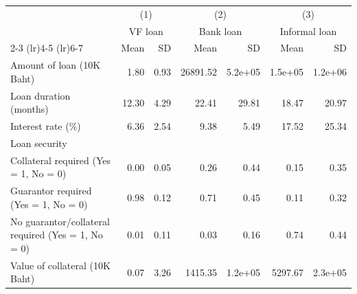 \begin{center} \begin{threeparttable} \begin{tabular}{l*{6}{r}} \hline \hline &\multicolumn{2}{c}{(1)}  &\multicolumn{2}{c}{(2)} &\multicolumn{2}{c}{(3)}\\  &\multicolumn{2}{c}{VF loan}  &\multicolumn{2}{c}{Bank loan} &\multicolumn{2}{c}{Informal loan} \\  \cmidrule(lr){2-3} \cmidrule(lr){4-5} \cmidrule(lr){6-7}
                    &        Mean&          SD&        Mean&          SD&        Mean&          SD\\
\midrule
Amount of loan (10K Baht)&        1.80&        0.93&    26891.52&     5.2e+05&     1.5e+05&     1.2e+06\\
Loan duration (months)&       12.30&        4.29&       22.41&       29.81&       18.47&       20.97\\
Interest rate (\%)  &        6.36&        2.54&        9.38&        5.49&       17.52&       25.34\\
Loan security       &            &            &            &            &            &            \\
\hspace{5pt} Collateral required (Yes = 1, No = 0)&        0.00&        0.05&        0.26&        0.44&        0.15&        0.35\\
\hspace{5pt} Guarantor required (Yes = 1, No = 0)&        0.98&        0.12&        0.71&        0.45&        0.11&        0.32\\
\hspace{5pt} No guarantor/collateral required (Yes = 1, No = 0)&        0.01&        0.11&        0.03&        0.16&        0.74&        0.44\\
\hspace{5pt} Value of collateral (10K Baht)&        0.07&        3.26&     1415.35&     1.2e+05&     5297.67&     2.3e+05\\
 \hline \end{tabular} \end{threeparttable} \end{center}
